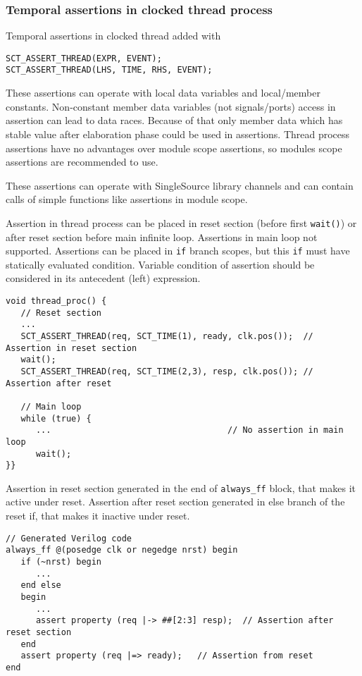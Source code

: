 \subsubsection{Temporal assertions in clocked thread process}

Temporal assertions in clocked thread added with 
\begin{lstlisting}[style=mycpp]
SCT_ASSERT_THREAD(EXPR, EVENT);                
SCT_ASSERT_THREAD(LHS, TIME, RHS, EVENT);      
\end{lstlisting}
%
These assertions can operate with local data variables and local/member constants. Non-constant member data variables (not signals/ports) access in assertion can lead to data races. Because of that only member data which has stable value after elaboration phase could be used in assertions. Thread process assertions have no advantages over module scope assertions, so modules scope assertions are recommended to use.

These assertions can operate with SingleSource library channels and can contain calls of simple functions like assertions in module scope.

Assertion in thread process can be placed in reset section (before first {\tt wait()}) or after reset section before main infinite loop. Assertions in main loop not supported. Assertions can be placed in {\tt if} branch scopes, but this {\tt if} must have statically evaluated condition. Variable condition of assertion should be considered in its antecedent (left) expression. 

\begin{lstlisting}[style=mycpp]
void thread_proc() {
   // Reset section
   ...
   SCT_ASSERT_THREAD(req, SCT_TIME(1), ready, clk.pos());  // Assertion in reset section
   wait();                        
   SCT_ASSERT_THREAD(req, SCT_TIME(2,3), resp, clk.pos()); // Assertion after reset

   // Main loop 
   while (true) { 
      ...                                   // No assertion in main loop 
      wait();
}}
\end{lstlisting}

Assertion in reset section generated in the end of {\tt always\_ff} block, that makes it active under reset. Assertion after reset section generated in else branch of the reset if, that makes it inactive under reset.

\begin{lstlisting}[style=myverilog]
// Generated Verilog code
always_ff @(posedge clk or negedge nrst) begin
   if (~nrst) begin
      ...
   end else 
   begin 
      ... 
      assert property (req |-> ##[2:3] resp);  // Assertion after reset section 
   end 
   assert property (req |=> ready);   // Assertion from reset  
end
\end{lstlisting}

